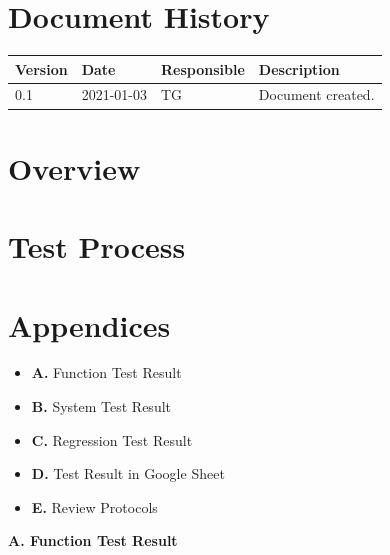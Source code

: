 \documentclass{article}
\date {#1}
\title {
    \documentNumber {06}    
    
    \documentVersion {0.1}
    
    \documentTitle {Software Verification and Validation Report}
    \documentGroup {2}
    
    \documentResponsible {Test Group}
    \documentAuthors {Test Group}
    
    \documentDate {2021-03-03}
}
\begin{document}
\maketitle
\thispagestyle{empty}

\newpage

\tableofcontents

\newpage


\section{Document History}
\begin{tabular}{ l | l | l | l }
    Version & Date & Responsible & Description \\
    \hline
  	0.1 & 2021-01-03 & TG & Document created. \\
\end{tabular}

\section{Overview}

\section{Test Process}

\section{Appendices}
\begin{itemize}
\item \textbf{A.} Function Test Result
\item \textbf{B.} System Test Result
\item \textbf{C.} Regression Test Result 
\item \textbf{D.} Test Result in Google Sheet
\item \textbf{E.} Review Protocols
\end{itemize}

\newpage
\begin{flushleft}
{\large\textbf{A. Function Test Result}}
\end{flushleft}
\end{document}
